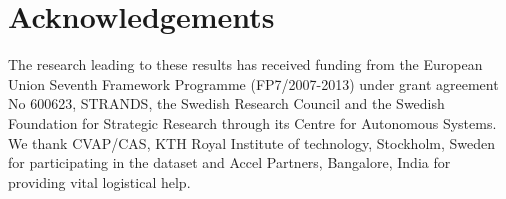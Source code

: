 \documentclass[letterpaper, 10 pt, conference]{ieeeconf}  %
\begin{document}

\section{Acknowledgements}
\label{sec:Acknowledgements}
The research leading to these results has received funding from the European
Union Seventh Framework Programme (FP7/2007-2013) under grant agreement No 600623, STRANDS,
the Swedish Research Council and the Swedish Foundation for Strategic Research through its Centre for Autonomous Systems.
We thank CVAP/CAS, KTH Royal Institute of technology, Stockholm, Sweden for participating in the dataset and Accel Partners, Bangalore, India for providing vital logistical help.




\end{document}

